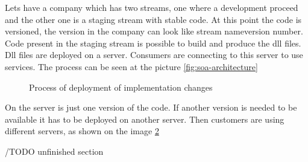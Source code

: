 Lets have a company which has two streams, one where a development proceed and the other one is a staging stream with stable code. At this point the code is versioned, the version in the company can look like {stream name}{version number}. Code present in the staging stream is possible to build and produce the dll files. Dll files are deployed on a server. Consumers are connecting to this server to use services. The process can be seen at the picture \ref{fig:soa-architecture}

\begin{figure}[htp] 
\caption{Process of deployment of implementation changes}
\label{fig:service-implementation}
\end{figure} 

\bigskip

On the server is just one version of the code. If another version is needed to be available it has to be deployed on another server. Then customers are using different servers, as shown on the image \ref{fig:consumer-server}

/TODO unfinished section

\begin{figure}[htp] 
\caption{}
\label{fig:consumer-server}
\end{figure} 

